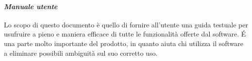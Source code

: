 \paragraph{\textit{Manuale utente}}
Lo scopo di questo documento è quello di fornire all'utente una guida testuale per usufruire a pieno e maniera efficace di tutte le funzionalità offerte dal software.
É una parte molto importante del prodotto, in quanto aiuta chi utilizza il software a eliminare possibili ambiguità sul suo corretto uso. 